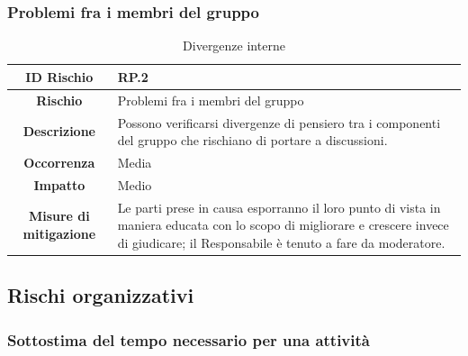 \documentclass[10pt, a4paper]{article}
\begin{document}
\subsubsection{Problemi fra i membri del gruppo}

{\renewcommand{\arraystretch}{1.5}
\begin{table}[H]
\begin{tabularx}{\textwidth}{c|X}
\textbf{ID Rischio} & RP.2 \\
\hline
\textbf{Rischio} & Problemi fra i membri del gruppo  \\
\hline
\textbf{Descrizione} & Possono verificarsi divergenze di pensiero tra i componenti del gruppo che rischiano di portare a discussioni. \\
\hline
\textbf{Occorrenza} & Media\\
\hline
\textbf{Impatto} & Medio \\
\hline
\textbf{Misure di mitigazione} & Le parti prese in causa esporranno il loro punto di vista in maniera educata con lo scopo di migliorare e crescere invece di giudicare; il Responsabile è tenuto a fare da moderatore. \\
\end{tabularx}
\caption{Divergenze interne}
\end{table}
}



\subsection{Rischi organizzativi}

\subsubsection{Sottostima del tempo necessario per una attività}
\end{document}
